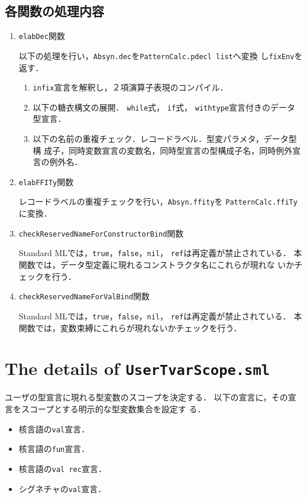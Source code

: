 \documentclass{jbook}
\newcommand{\txt}[2]{#2}
\newcommand{\code}[1]{\mbox{\large\tt #1}}
\begin{document}
\subsection{各関数の処理内容}
\begin{enumerate}
\item \code{elabDec}関数

以下の処理を行い，\code{Absyn.dec}を\code{PatternCalc.pdecl list}へ変換
し\code{fixEnv}を返す．
\begin{enumerate}
\item \code{infix}宣言を解釈し，２項演算子表現のコンパイル．
\item 以下の糖衣構文の展開．
\code{while}式，
\code{if}式，
\code{withtype}宣言付きのデータ型宣言．
\item 以下の名前の重複チェック．レコードラベル．型変パラメタ，データ型構
成子，同時変数宣言の変数名，同時型宣言の型構成子名，同時例外宣言の例外名．
\end{enumerate}
	
\item \code{elabFFITy}関数

レコードラベルの重複チェックを行い，\code{Absyn.ffity}を
\code{PatternCalc.ffiTy}に変換．

\item \code{checkReservedNameForConstructorBind}関数

	Standard MLでは，\code{true}，\code{false}，\code{nil}，
\code{ref}は再定義が禁止されている．
	本関数では，データ型定義に現れるコンストラクタ名にこれらが現れな
いかチェックを行う．
\item \code{checkReservedNameForValBind}関数

	Standard MLでは，\code{true}，\code{false}，\code{nil}，
\code{ref}は再定義が禁止されている．
	本関数では，変数束縛にこれらが現れないかチェックを行う．
\end{enumerate}

\else%
\fi%

\section{\txt{\code{UserTvarScope.sml}の処理の詳細}{The details of \code{UserTvarScope.sml}}}
\ifjp%
	ユーザの型宣言に現れる型変数のスコープを決定する．
	以下の宣言に，その宣言をスコープとする明示的な型変数集合を設定す
る．
\begin{itemize}
\item 核言語の\code{val}宣言．
\item 核言語の\code{fun}宣言．
\item 核言語の\code{val rec}宣言．
\item シグネチャの\code{val}宣言．
\end{itemize}
\end{document}
